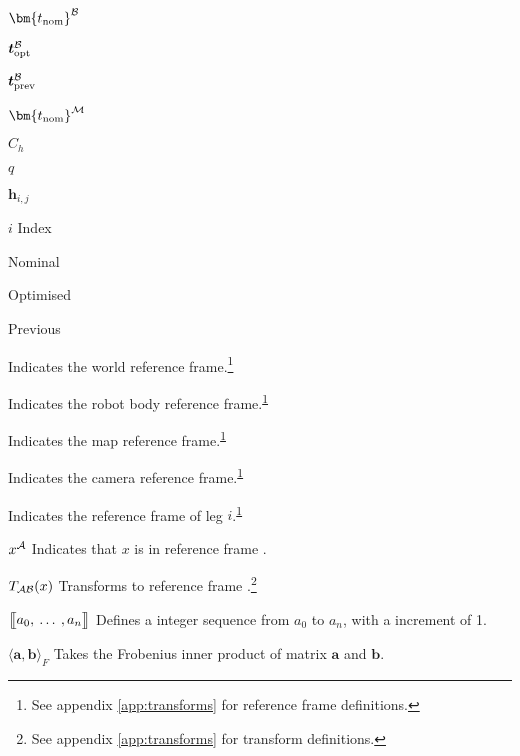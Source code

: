 \begin{Nomencl}[2.75cm]
    \item[\(\bm{t_\text{nom}}\inrefframe{\fbody}\)] 
    \item[\(\boldsymbol{t}_\text{opt}^\fbody\)] 
    \item[\(\boldsymbol{t}_\text{prev}^\fbody\)] 
    \item[\(\bm{t_\text{nom}} ^{\fmap}\)] \\
    \item[\(C_h\)] 
    \item[\(q\)] \\
    \item[\(\bm{h}_{i,j}\)] 
     
    

    \item[\(i\)] Index
    \item[\text{nom}] Nominal
    \item[\text{opt}] Optimised
    \item[\text{prev}] Previous
    \item[\fworld] Indicates the world reference frame.\footnote{\label{note1}See appendix \ref{app:transforms} for reference frame definitions.}
    \item[\fbody] Indicates the robot body reference frame.\textsuperscript{\ref{note1}}
    \item[\fmap] Indicates the map reference frame.\textsuperscript{\ref{note1}}
    \item[\fcamera] Indicates the camera reference frame.\textsuperscript{\ref{note1}}
    \item[\fleg] Indicates the reference frame of leg \(i\).\textsuperscript{\ref{note1}}

\newpage
{}
    \item[\(x\inrefframe{A}\)] Indicates that \(x\) is in reference frame .
    \item[\(\transframe{x}{\refframe{A}}{\refframe{B}}\)] Transforms  to reference frame .\footnote{See appendix \ref{app:transforms} for transform definitions.}
    \item[\(\seq{a_0}{a_1}{a_n}\)] Defines a integer sequence from \(a_0\) to \(a_n\), with a increment of 1.
    \item[\(\langle \bm{a}, \bm{b} \rangle_F\)] Takes the Frobenius inner product of matrix \(\bm{a}\) and \(\bm{b}\).


\end{Nomencl}
